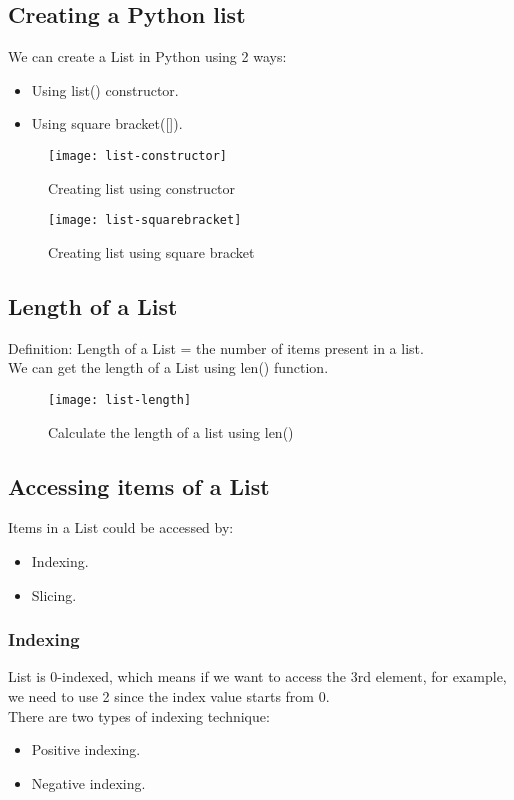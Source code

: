 \subsection{Creating a Python list}
We can create a List in Python using 2 ways:
\begin{itemize}
	\item Using list() constructor.
	\item Using square bracket([]).
\end{itemize}
\newpage

\begin{figure}[h]
	\centering
	\begin{minipage}[t]{0.47\textwidth}
		\centering
		\texttt{[image: list-constructor]}
		\caption{Creating list using constructor}
		\label{fig:left}
	\end{minipage}
	\hfill
	\begin{minipage}[t]{0.48\textwidth}
		\centering
		\texttt{[image: list-squarebracket]}
		\caption{Creating list using square bracket}
		\label{fig:right}
	\end{minipage}
\end{figure}

\subsection{Length of a List}

{\large Definition:} Length of a List = the number of items present in a list. \\ [0.5em]
We can get the length of a List using len() function.
\begin{figure}[h]
	\centering
	\texttt{[image: list-length]}
	\caption{Calculate the length of a list using len()}
	\label{fig:length}
\end{figure}

\subsection{Accessing items of a List}
{\large Items in a List could be accessed by:}
\begin{itemize}
	\item Indexing.
	\item Slicing. 
\end{itemize}
\subsubsection{Indexing}
 List is 0-indexed, which means if we want to access the 3rd element, for example, we need to use 2 since the index value starts from 0. \\ [0.5em]
 There are two types of indexing technique:
 \begin{itemize}
 	\item Positive indexing.
 	\item Negative indexing.
 \end{itemize}
 \newpage
 
